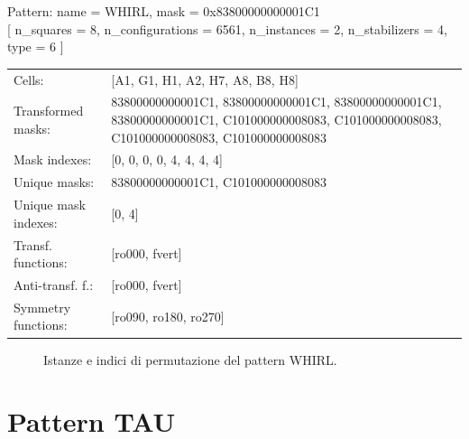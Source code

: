 \begin{tcolorbox}[sharp corners, fontupper=\ttfamily\small, colback=white]
  \noindent Pattern: name = WHIRL, mask = 0x83800000000001C1\\
  {[} n\_squares = 8, n\_configurations = 6561,
  n\_instances = 2, n\_stabilizers = 4, type = 6 { ]}\\[1.0ex]
  \begin{tabularx}{\textwidth}{@{} p{3.5cm} X @{}}
    Cells:               & {[}A1, G1, H1, A2, H7, A8, B8, H8{]}\\[0.5ex]
    Transformed masks:   & 83800000000001C1, 83800000000001C1, 83800000000001C1, 83800000000001C1, C101000000008083, C101000000008083, C101000000008083, C101000000008083\\[0.5ex]
    Mask indexes:        & {[}0, 0, 0, 0, 4, 4, 4, 4{]}\\[0.5ex]
    Unique masks:        & 83800000000001C1, C101000000008083\\[0.5ex]
    Unique mask indexes: & {[}0, 4{]}\\[0.5ex]
    Transf. functions:   & {[}ro000, fvert{]}\\[0.5ex]
    Anti-transf. f.:     & {[}ro000, fvert{]}\\[0.5ex]
    Symmetry functions:  & {[}ro090, ro180, ro270{]}\\[0.5ex]
  \end{tabularx}
\end{tcolorbox}

\begin{figure}[htbp]
  \centering
   \hfill
   \hfill
   \hfill
  \vspace{0.3cm}
   \hfill
   \hfill
   \hfill
  \caption{Istanze e indici di permutazione del pattern WHIRL.}
\end{figure}

\newpage

\section{Pattern TAU}

